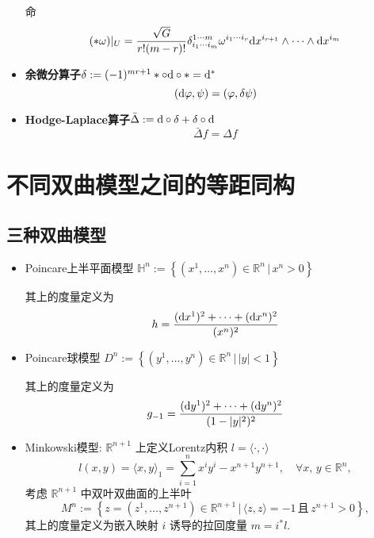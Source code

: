 \begin{itemize}
        命
        \begin{equation*}
            (*\omega)|_U=\frac{\sqrt{G}}{r!(m-r)!}\delta^{1\cdots m}_{i_1\cdots i_m}\omega^{i_1\cdots i_r}{\rm d}{x^{i_{r+1}}}\wedge\cdots\wedge{\rm d}{x^{i_m}}
        \end{equation*}
        \item \textbf{余微分算子}$\delta := (-1)^{mr+1}*\circ{\rm d}\circ*={\rm d}^*$
        \begin{equation*}
            ({\rm d}{\varphi},\psi)=(\varphi, \delta\psi)
        \end{equation*}
        \item \textbf{Hodge-Laplace算子}$\bar{\Delta}:={\rm d}\circ\delta+\delta\circ{\rm d}$
        \begin{equation*}
            \bar{\Delta}f=\Delta f
        \end{equation*}
    \end{itemize}
\section{不同双曲模型之间的等距同构}
\subsection{三种双曲模型}
    \begin{itemize}
        \item Poincare上半平面模型 $\mathbb{H}^n:=\left\{\left(x^1,\dots,x^n\right)\in\mathbb{R}^n\,\Big|\,x^n>0\right\}$  
        
        其上的度量定义为
        \begin{equation*}
            h=\frac{({\rm d} x^1)^2+\cdots+({\rm d} x^n)^2}{(x^n)^2}
        \end{equation*}

        \item Poincare球模型 $D^n:=\left\{\left(y^1,\dots,y^n\right)\in\mathbb{R}^n\,\Big|\,|y|<1\right\}$
        
        其上的度量定义为
        \begin{equation*}
            g_{-1}=\frac{({\rm d} y^1)^2+\cdots+({\rm d} y^n)^2}{(1-|y|^2)^2}
        \end{equation*}

        \item Minkowski模型: $\mathbb{R}^{n+1}$ 上定义Lorentz内积 $l=\langle\cdot,\cdot\rangle$
        \begin{equation*}
            l(x,y)=\langle x,y\rangle_1=\sum_{i=1}^{n}x^iy^i-x^{n+1}y^{n+1},\quad\forall x,\,y\in\mathbb{R}^n,
        \end{equation*}
        考虑 $\mathbb{R}^{n+1}$ 中双叶双曲面的上半叶
        \begin{equation*}
            M^n:=\left\{z=\left(z^1,\dots,z^{n+1}\right)\in\mathbb{R}^{n+1}\,\Big|\,\langle z,z\rangle=-1\,\text{且}\,z^{n+1}>0\right\},
        \end{equation*}
        其上的度量定义为嵌入映射 $i$ 诱导的拉回度量 $m=i^*l$.
    \end{itemize}
